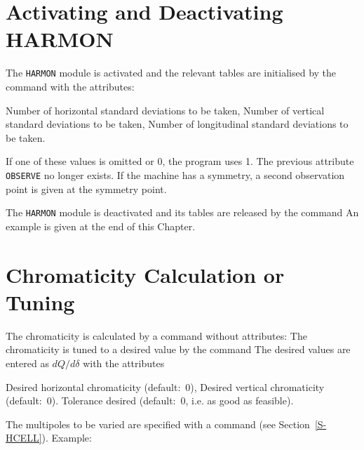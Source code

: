 \section{Activating and Deactivating HARMON}
\label{S-HSETUP}
The {\tt HARMON} module is activated and the relevant tables are initialised
by the command
with the attributes:
\begin{mylist}
Number of horizontal standard deviations to be taken,
Number of vertical standard deviations to be taken,
Number of longitudinal standard deviations to be taken.
\end{mylist}
If one of these values is omitted or 0, the program uses 1.
The previous attribute {\tt OBSERVE} no longer exists.
If the machine has a symmetry, a second observation point is given
at the symmetry point.
 
The {\tt HARMON} module is deactivated and its tables are released
by the  command
An example is given at the end of this Chapter.
 
\section{Chromaticity Calculation or Tuning}
\label{S-HCHROM}
The chromaticity is calculated by a command without attributes:
The chromaticity is tuned to a desired value by the 
command
The desired values are entered as \(dQ/d\delta\) with the attributes
\begin{mylist}
Desired horizontal chromaticity (default:~0),
Desired vertical chromaticity (default:~0).
Tolerance desired (default:~0, i.e. as good as feasible).
\end{mylist}
The multipoles to be varied are specified with a  command
(see Section~\ref{S-HCELL}).
Example:
 
